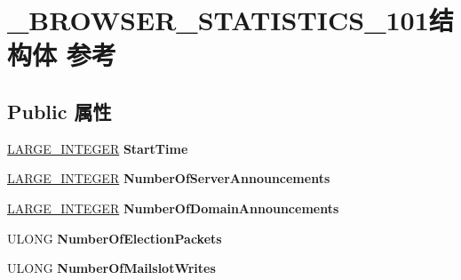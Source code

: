 \hypertarget{struct___b_r_o_w_s_e_r___s_t_a_t_i_s_t_i_c_s__101}{}\section{\+\_\+\+B\+R\+O\+W\+S\+E\+R\+\_\+\+S\+T\+A\+T\+I\+S\+T\+I\+C\+S\+\_\+101结构体 参考}
\label{struct___b_r_o_w_s_e_r___s_t_a_t_i_s_t_i_c_s__101}
\subsection*{Public 属性}
\begin{DoxyCompactItemize}
\item 
\mbox{\label{struct___b_r_o_w_s_e_r___s_t_a_t_i_s_t_i_c_s__101_a358a04b4c8312e96d22eabf31def78ad}} 
\hyperlink{union___l_a_r_g_e___i_n_t_e_g_e_r}{L\+A\+R\+G\+E\+\_\+\+I\+N\+T\+E\+G\+ER} {\bfseries Start\+Time}
\item 
\mbox{\label{struct___b_r_o_w_s_e_r___s_t_a_t_i_s_t_i_c_s__101_aa1a289ffcbc05a89ef1af2ef38e2132c}} 
\hyperlink{union___l_a_r_g_e___i_n_t_e_g_e_r}{L\+A\+R\+G\+E\+\_\+\+I\+N\+T\+E\+G\+ER} {\bfseries Number\+Of\+Server\+Announcements}
\item 
\mbox{\label{struct___b_r_o_w_s_e_r___s_t_a_t_i_s_t_i_c_s__101_afa5e58b54dbd694f9c17fc13faaeadf7}} 
\hyperlink{union___l_a_r_g_e___i_n_t_e_g_e_r}{L\+A\+R\+G\+E\+\_\+\+I\+N\+T\+E\+G\+ER} {\bfseries Number\+Of\+Domain\+Announcements}
\item 
\mbox{\label{struct___b_r_o_w_s_e_r___s_t_a_t_i_s_t_i_c_s__101_aa67bf34be49aaabccc6709154380b18b}} 
U\+L\+O\+NG {\bfseries Number\+Of\+Election\+Packets}
\item 
\mbox{\label{struct___b_r_o_w_s_e_r___s_t_a_t_i_s_t_i_c_s__101_a46614e6f180c9dcf3104a6f864427c9b}} 
U\+L\+O\+NG {\bfseries Number\+Of\+Mailslot\+Writes}
\item 
\mbox{\label{struct___b_r_o_w_s_e_r___s_t_a_t_i_s_t_i_c_s__101_a2410e3f1cf7d224d29b9410e86a57886}} 

\end{DoxyCompactItemize}

